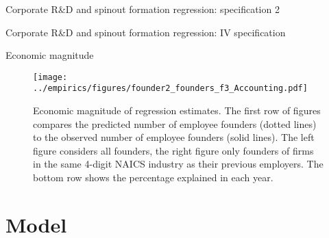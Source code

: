 \documentclass[english,usenames,dvipsnames]{beamer}
\begin{document}
\begin{frame}{Corporate R\&D and spinout formation regression: specification 2}
\begin{table}
	\Tiny
	\centering
	
	\caption{\tiny The dependent variable is the average yearly number of founders from the parent firm joining startups in years $t+1,t+2,t+3$, normalized by a trailing five-year moving average of assets. Independent variables are also normalized by assets. Standard errors are clustered at the firm level.}
	\label{table:RDandSpinoutFormation_at_founder2_l3f3}
\end{table}
\end{frame}

\begin{frame}{Corporate R\&D and spinout formation regression: IV specification}
\begin{table}
	\Tiny
	\centering
	
	\caption{\tiny The dependent variable is the log of the average yearly number of founders from the parent firm joining startups, over the years $t+1,t+2,t+3$. Independent variables are similarly averaged over $t,t-1,t-2$. Columns (1) and (5) are estimated by OLS. The remaining columns columns are estimated by instrumenting R\&D spending using firm-specific tax incentives for R\&D, from Bloom 2013. Standard errors are clustered at the firm level.}
	\label{table:RDandSpinoutFormation_iv_founder2_l3f3}
\end{table}
\end{frame}


\begin{frame}{Economic magnitude}
\begin{figure}[!htb]
	\texttt{[image: ../empirics/figures/founder2\_founders\_f3\_Accounting.pdf]}
	\caption{\tiny Economic magnitude of regression estimates. The first row of figures compares the predicted number of employee founders (dotted lines) to the observed number of employee founders (solid lines). The left figure considers all founders, the right figure only founders of firms in the same 4-digit NAICS industry as their previous employers. The bottom row shows the percentage explained in each year.}
\end{figure}
\end{frame}

\section{Model}
\end{document}
